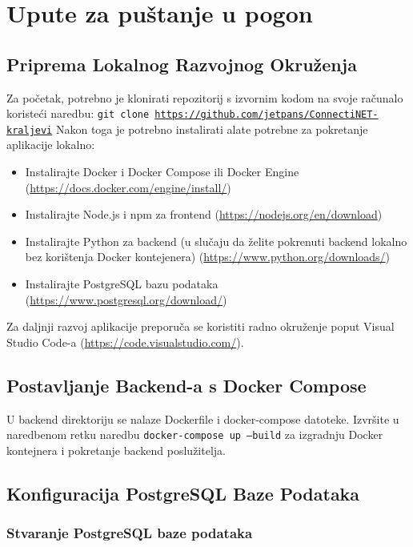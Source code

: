 			
			\section{Upute za puštanje u pogon}
				
			\subsection{Priprema Lokalnog Razvojnog Okruženja}
			
			Za početak, potrebno je klonirati repozitorij s izvornim kodom na svoje računalo koristeći naredbu:
			\texttt{git clone \url{https://github.com/jetpans/ConnectiNET-kraljevi}} 
			Nakon toga je potrebno instalirati alate potrebne za pokretanje aplikacije lokalno:
			
			\begin{itemize}
					\item Instalirajte Docker i Docker Compose ili Docker Engine (\url{https://docs.docker.com/engine/install/})
					\item Instalirajte Node.js i npm za frontend (\url{https://nodejs.org/en/download})
					\item Instalirajte Python za backend (u slučaju da želite pokrenuti backend lokalno bez korištenja Docker kontejenera) (\url{https://www.python.org/downloads/})
					\item Instalirajte PostgreSQL bazu podataka (\url{https://www.postgresql.org/download/})
			\end{itemize}
			
			Za daljnji razvoj aplikacije preporuča se koristiti radno okruženje poput Visual Studio Code-a (\url{https://code.visualstudio.com/}). 
			
			\subsection{Postavljanje Backend-a s Docker Compose}
			
			U backend direktoriju se nalaze Dockerfile i docker-compose datoteke. Izvršite u naredbenom retku naredbu 
			\texttt{docker-compose up --build} 
			za izgradnju Docker kontejnera i pokretanje backend poslužitelja.
			
			\subsection{Konfiguracija PostgreSQL Baze Podataka}
			
			\subsubsection{Stvaranje PostgreSQL baze podataka}
			
